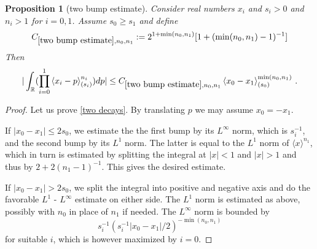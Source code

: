 \documentclass[12pt,reqno]{amsart}
\theoremstyle{plain}
\newtheorem{proposition}[theorem]{Proposition}
\numberwithin{equation}{section}
\theoremstyle{remark}
\newcommand{\uses}[1]{}
\newcommand{\usesdefs}[1]{}
\newcommand{\R}{{\mathbb R}}
\begin{document}
\begin{proposition}[two bump estimate]\label{two bump estimate}\uses{}\usesdefs{bracket bump}
    Consider real numbers $x_i$ and  $s_i>0$ and $n_i>1$ for $i=0,1$.  Assume $s_0\ge s_1$ and define
\begin{equation}\label{tb0}
     C_{\ref{two bump estimate},n_0,n_1}:=2^{1+\min(n_0,n_1)} [1+(\min(n_0,n_1)-1)^{-1}]
\end{equation}
  Then
\begin{equation}\label{two decays}
   | \int_{\R} (\prod_{i=0}^1 \left<x_i-p\right>^{n_i}_{(s_i)}) dp|\le C_{\ref{two bump estimate},n_0,n_1}
\left<x_0-x_1\right>^{\min(n_0,n_1)}_{(s_0)}\, .
\end{equation}
\end{proposition}
\begin{proof}
Let us prove \eqref{two decays}.
By translating $p$ we may assume $x_0=-x_1$.

If $|x_0-x_1|\le 2s_0$, we estimate the the first bump
by its $L^\infty$ norm, which is $s_i^{-1}$, and the second bump by its $L^1$ norm.
The latter is equal to the $L^1$ norm of $\langle x\rangle^{n_1}$, which in turn is estimated by splitting the integral
at $|x|<1$ and $|x|>1$ and thus by $2+2(n_1-1)^{-1}$. This gives the desired estimate.

If $|x_0-x_1|> 2s_0$, we split the integral into positive and negative axis
and do the favorable $L^1$ - $L^\infty$ estimate on either side.
The $L^1$ norm is estimated as above, possibly with $n_0$ in place of $n_1$ if needed. The $L^\infty$ norm is
bounded by
\begin{equation}
    s_i^{-1}(s_i^{-1}|x_0-x_1|/2)^{-\min(n_0,n_1)}
\end{equation}
for suitable $i$, which is however
maximized by $i=0$.
\end{proof}
\end{document}
